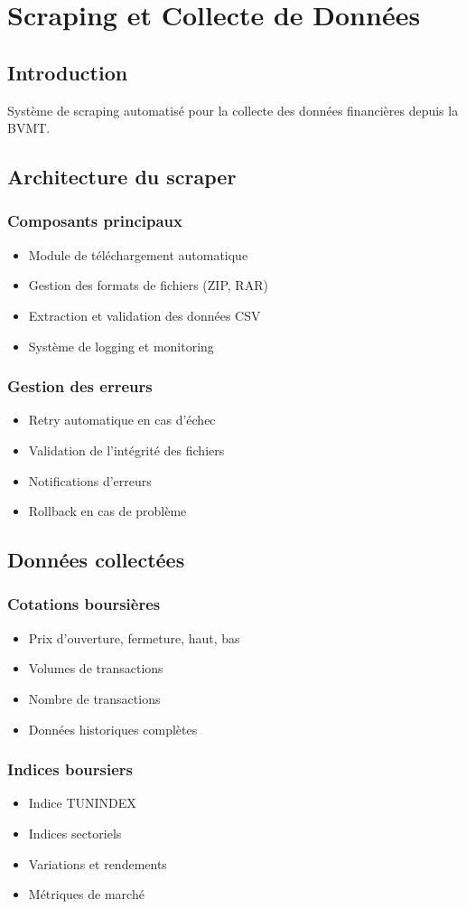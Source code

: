 \section{Scraping et Collecte de Données}

\subsection{Introduction}
Système de scraping automatisé pour la collecte des données financières depuis la BVMT.

\subsection{Architecture du scraper}
\subsubsection{Composants principaux}
\begin{itemize}
    \item Module de téléchargement automatique
    \item Gestion des formats de fichiers (ZIP, RAR)
    \item Extraction et validation des données CSV
    \item Système de logging et monitoring
\end{itemize}

\subsubsection{Gestion des erreurs}
\begin{itemize}
    \item Retry automatique en cas d'échec
    \item Validation de l'intégrité des fichiers
    \item Notifications d'erreurs
    \item Rollback en cas de problème
\end{itemize}

\subsection{Données collectées}
\subsubsection{Cotations boursières}
\begin{itemize}
    \item Prix d'ouverture, fermeture, haut, bas
    \item Volumes de transactions
    \item Nombre de transactions
    \item Données historiques complètes
\end{itemize}

\subsubsection{Indices boursiers}
\begin{itemize}
    \item Indice TUNINDEX
    \item Indices sectoriels
    \item Variations et rendements
    \item Métriques de marché
\end{itemize}

